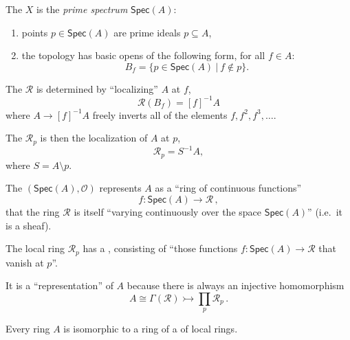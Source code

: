 \documentclass[lambek.tex]{subfiles}
\begin{document}

The  $X$ is the \emph{prime spectrum} $\mathsf{Spec}(A)$:
 \begin{enumerate}
\item points $p\in \mathsf{Spec}(A)$ are prime ideals $p\subseteq A$,
\item the topology has basic opens of the following form, for all $f\in A$:
 $$B_f = \{ p\in \mathsf{Spec}(A)\ |\ f\not\in p \}.$$
\end{enumerate}
The  $\mathcal {R}$ is determined by ``localizing'' $A$ at $f$,
\[
\mathcal{R}(B_f) = [f]^{-1}A
\]
where $A \rightarrow [f]^{-1}A$ freely inverts all of the elements $f, f^2, f^3, \dots$.
\medskip

The  $\mathcal {R}_p$ is then the localization of $A$ at $p$,
\[
\mathcal{R}_p = S^{-1}A, 
\]
where $S = A\setminus p$.


The  $(\mathsf{Spec}(A), \mathcal {O})$ represents $A$ as a ``ring of continuous functions'' 
\[
f : \mathsf{Spec}(A) \to \mathcal {R}\,,
\]
 that the ring $\mathcal{R}$ is itself ``varying continuously over the space $\mathsf{Spec}(A)$'' (i.e.\ it is a sheaf).  
\medskip

The local ring $\mathcal{R}_p$ has a , consisting of ``those functions  $f : \mathsf{Spec}(A) \to \mathcal{R}$ that vanish at $p$''.
\medskip

It is a ``representation'' of $A$ because there is always an injective homomorphism
\[
A \cong \Gamma(\mathcal{R}) \rightarrowtail \prod_{p}\mathcal{R}_p \,.
\]

\begin{corollary}
Every ring $A$ is isomorphic to a ring of a  of local rings.
\end{corollary}
\end{document}

